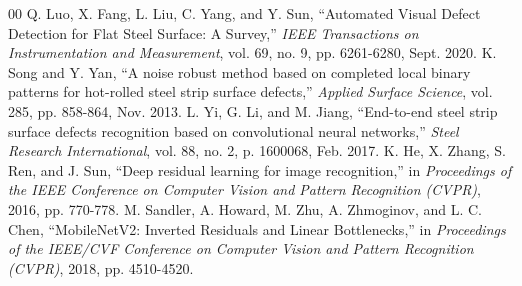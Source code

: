 \documentclass[conference, a4paper]{IEEEtran}
\begin{document}
\begin{thebibliography}{00}
 Q. Luo, X. Fang, L. Liu, C. Yang, and Y. Sun, ``Automated Visual Defect Detection for Flat Steel Surface: A Survey,'' \textit{IEEE Transactions on Instrumentation and Measurement}, vol. 69, no. 9, pp. 6261-6280, Sept. 2020.
 K. Song and Y. Yan, ``A noise robust method based on completed local binary patterns for hot-rolled steel strip surface defects,'' \textit{Applied Surface Science}, vol. 285, pp. 858-864, Nov. 2013.
 L. Yi, G. Li, and M. Jiang, ``End-to-end steel strip surface defects recognition based on convolutional neural networks,'' \textit{Steel Research International}, vol. 88, no. 2, p. 1600068, Feb. 2017.
 K. He, X. Zhang, S. Ren, and J. Sun, ``Deep residual learning for image recognition,'' in \textit{Proceedings of the IEEE Conference on Computer Vision and Pattern Recognition (CVPR)}, 2016, pp. 770-778.
 M. Sandler, A. Howard, M. Zhu, A. Zhmoginov, and L. C. Chen, ``MobileNetV2: Inverted Residuals and Linear Bottlenecks,'' in \textit{Proceedings of the IEEE/CVF Conference on Computer Vision and Pattern Recognition (CVPR)}, 2018, pp. 4510-4520.
\end{thebibliography}
\end{document}
